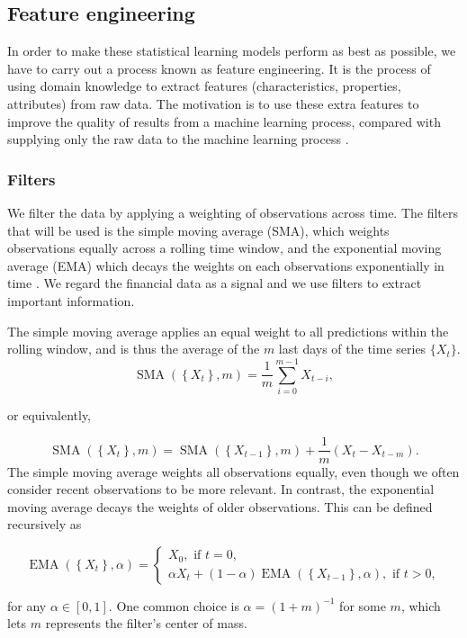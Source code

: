 \documentclass[twoside]{report}
\begin{document}
\begin{spacing}{1}
\subsection{Feature engineering}
In order to make these statistical learning models perform as best as possible, we have to carry out a process known as feature engineering. It is the process of using domain knowledge to extract features (characteristics, properties, attributes) from raw data. The motivation is to use these extra features to improve the quality of results from a machine learning process, compared with supplying only the raw data to the machine learning process \cite{heaton2016empirical}. 
\subsubsection{Filters}
We filter the data by applying a weighting of observations across time. The
filters that will be used is the simple moving average (SMA), which weights
observations equally across a rolling time window, and the exponential moving average (EMA) which decays the weights on each observations exponentially in time \cite{brockwell2016introduction}. We regard the financial data as a signal and we use filters to extract important information.


The simple moving average applies an equal weight to all predictions within the rolling window, and is thus the average of the $m$ last days of the time series $\{X_t\}$.
\[
\operatorname{SMA}\left(\left\{X_{t}\right\}, m\right)=\frac{1}{m} \sum_{i=0}^{m-1} X_{t-i},
\]

or equivalently,

\[
\operatorname{SMA}\left(\left\{X_{t}\right\}, m\right)=\operatorname{SMA}\left(\left\{X_{t-1}\right\}, m\right)+\frac{1}{m}\left(X_{t}-X_{t-m}\right).
\]
The simple moving average weights all observations equally, even though we often consider recent observations to be more relevant. In contrast, the exponential moving average decays the weights of older observations. This can be defined recursively as

\[
\operatorname{EMA}\left(\left\{X_{t}\right\}, \alpha\right)=\left\{\begin{array}{l}
X_{0}, \text { if } t=0, \\
\alpha X_{t}+(1-\alpha) \operatorname{EMA}\left(\left\{X_{t-1}\right\}, \alpha\right), \text { if } t>0,
\end{array}\right.
\]

for any $\alpha \in [0,1]$. One common choice is $\alpha = (1+m)^{-1}$ for some $m$, which lets $m$ represents the filter's center of mass.



\end{spacing}
\end{document}

